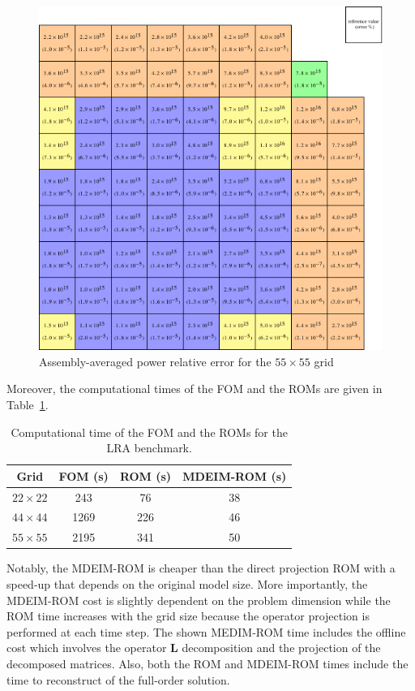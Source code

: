 \documentclass[]{interact}
\theoremstyle{plain}%
\theoremstyle{definition}
\theoremstyle{remark}
\begin{document}
\begin{figure}[H]
	\centering
	\includegraphics[width=0.7\linewidth]{../figures/lra_assemb_fm=5.pdf} 
	\caption{Assembly-averaged power relative error for the $55\times 55$ grid}
	\label{fig:assembly power error fm=5}
\end{figure} 

Moreover, the computational times of the FOM and the ROMs are given in Table~\ref{table:cpu time}.

\begin{table}[h!]
	\centering
	\caption{Computational time of the FOM and the ROMs for the LRA benchmark.}
	\label{table:cpu time}
	\begin{tabular}{c|c|c|c}  
		Grid &	FOM (s)   &  ROM (s) & MDEIM-ROM (s)    \\
		\hline
		$22\times 22$ &  243   & 76   & 38   \\
		$44\times 44$ &  1269  & 226   & 46   \\
		$55\times 55$ &  2195  & 341   & 50   \\
		\hline
	\end{tabular}
\end{table}

Notably, the MDEIM-ROM is cheaper than the direct projection ROM with a speed-up that depends on the original model size.
More importantly, the MDEIM-ROM cost is slightly dependent on the problem dimension while the ROM time increases with the grid size because the operator projection is performed at each time step.
The shown MEDIM-ROM time includes the offline cost which involves the operator $\mathbf{L}$ decomposition and the projection of the decomposed matrices.
Also, both the ROM and MDEIM-ROM times include the time to reconstruct of the full-order solution.
\end{document}
